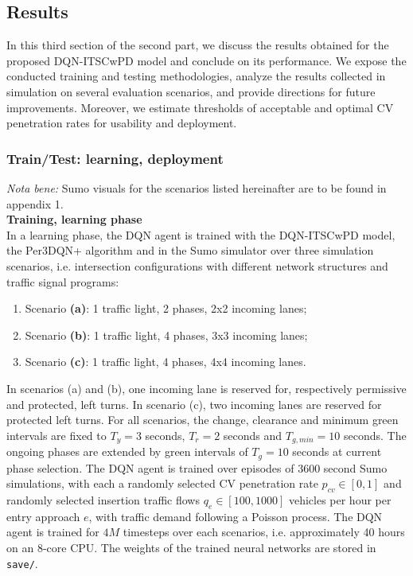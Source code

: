 \subsection{Results}

In this third section of the second part, we discuss the results obtained for the proposed DQN-ITSCwPD model and conclude on its performance. We expose the conducted training and testing methodologies, analyze the results collected in simulation on several evaluation scenarios, and provide directions for future improvements. Moreover, we estimate thresholds of acceptable and optimal CV penetration rates for usability and deployment.

\subsubsection{Train/Test: learning, deployment}

\textit{Nota bene:} Sumo visuals for the scenarios listed hereinafter are to be found in appendix 1. \\

\textbf{Training, learning phase} \\
In a learning phase, the DQN agent is trained with the DQN-ITSCwPD model, the Per3DQN+ algorithm and in the Sumo simulator over three simulation scenarios, i.e. intersection configurations with different network structures and traffic signal programs:
\begin{enumerate}
\setlength\itemsep{-0.5em}
  \item Scenario \textbf{(a)}: 1 traffic light, 2 phases, 2x2 incoming lanes;
  \item Scenario \textbf{(b)}: 1 traffic light, 4 phases, 3x3 incoming lanes;
  \item Scenario \textbf{(c)}: 1 traffic light, 4 phases, 4x4 incoming lanes.
\end{enumerate}
In scenarios (a) and (b), one incoming lane is reserved for, respectively permissive and protected, left turns. In scenario (c), two incoming lanes are reserved for protected left turns. For all scenarios, the change, clearance and minimum green intervals are fixed to $T_y = 3$ seconds, $T_r = 2$ seconds and $T_{g,min} = 10$ seconds. The ongoing phases are extended by green intervals of $T_g = 10$ seconds at current phase selection. The DQN agent is trained over episodes of 3600 second Sumo simulations, with each a randomly selected CV penetration rate $p_{cv} \in [0,1]$ and randomly selected insertion traffic flows $q_e \in [100,1000]$ vehicles per hour per entry approach $e$, with traffic demand following a Poisson process.
The DQN agent is trained for $4M$ timesteps over each scenarios, i.e. approximately 40 hours on an 8-core CPU. The weights of the trained neural networks are stored in \texttt{save/}. \\

